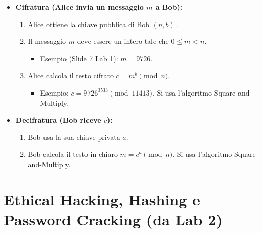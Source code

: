 \begin{itemize}
    \item \textbf{Cifratura (Alice invia un messaggio \(m\) a Bob):}
    \begin{enumerate}
        \item Alice ottiene la chiave pubblica di Bob \((n, b)\).
        \item Il messaggio \(m\) deve essere un intero tale che \(0 \le m < n\).
            \begin{itemize} \item Esempio (Slide 7 Lab 1): \(m = 9726\). \end{itemize}
        \item Alice calcola il testo cifrato \(c = m^b \pmod{n}\).
            \begin{itemize} \item Esempio: \(c = 9726^{3533} \pmod{11413}\). Si usa l'algoritmo Square-and-Multiply. \end{itemize}
    \end{enumerate}

    \item \textbf{Decifratura (Bob riceve \(c\)):}
    \begin{enumerate}
        \item Bob usa la sua chiave privata \(a\).
        \item Bob calcola il testo in chiaro \(m = c^a \pmod{n}\). Si usa l'algoritmo Square-and-Multiply.
    \end{enumerate}
\end{itemize}

\section{Ethical Hacking, Hashing e Password Cracking (da Lab 2)}

